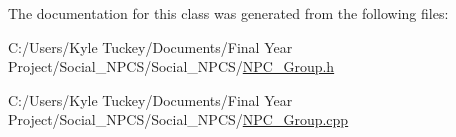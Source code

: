 The documentation for this class was generated from the following files\+:\begin{DoxyCompactItemize}
\item 
C\+:/\+Users/\+Kyle Tuckey/\+Documents/\+Final Year Project/\+Social\+\_\+\+N\+P\+C\+S/\+Social\+\_\+\+N\+P\+C\+S/\hyperlink{_n_p_c___group_8h}{N\+P\+C\+\_\+\+Group.\+h}\item 
C\+:/\+Users/\+Kyle Tuckey/\+Documents/\+Final Year Project/\+Social\+\_\+\+N\+P\+C\+S/\+Social\+\_\+\+N\+P\+C\+S/\hyperlink{_n_p_c___group_8cpp}{N\+P\+C\+\_\+\+Group.\+cpp}\end{DoxyCompactItemize}
